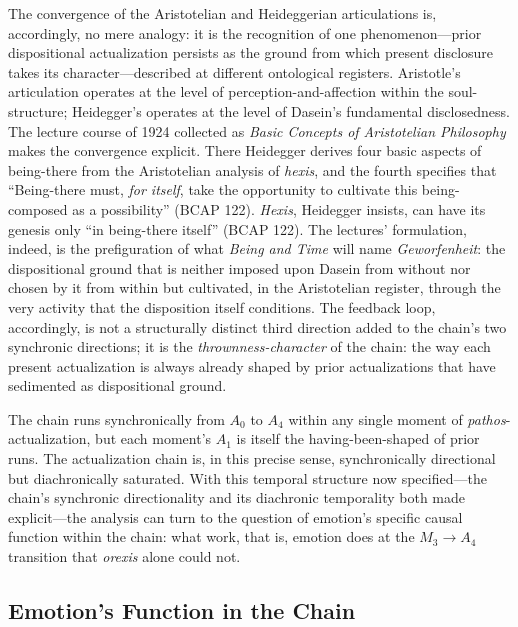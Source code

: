\documentclass{article}
\begin{document}
The convergence of the Aristotelian and Heideggerian articulations is, accordingly, no mere analogy: it is the recognition of one phenomenon---prior dispositional actualization persists as the ground from which present disclosure takes its character---described at different ontological registers. Aristotle's articulation operates at the level of perception-and-affection within the soul-structure; Heidegger's operates at the level of Dasein's fundamental disclosedness. The lecture course of 1924 collected as \textit{Basic Concepts of Aristotelian Philosophy} makes the convergence explicit. There Heidegger derives four basic aspects of being-there from the Aristotelian analysis of \textit{hexis}, and the fourth specifies that ``Being-there must, \textit{for itself}, take the opportunity to cultivate this being-composed as a possibility'' (BCAP 122). \textit{Hexis}, Heidegger insists, can have its genesis only ``in being-there itself'' (BCAP 122). The lectures' formulation, indeed, is the prefiguration of what \textit{Being and Time} will name \textit{Geworfenheit}: the dispositional ground that is neither imposed upon Dasein from without nor chosen by it from within but cultivated, in the Aristotelian register, through the very activity that the disposition itself conditions. The feedback loop, accordingly, is not a structurally distinct third direction added to the chain's two synchronic directions; it is the \textit{thrownness-character} of the chain: the way each present actualization is always already shaped by prior actualizations that have sedimented as dispositional ground.

The chain runs synchronically from $A_0$ to $A_4$ within any single moment of \textit{pathos}-actualization, but each moment's $A_1$ is itself the having-been-shaped of prior runs. The actualization chain is, in this precise sense, synchronically directional but diachronically saturated. With this temporal structure now specified---the chain's synchronic directionality and its diachronic temporality both made explicit---the analysis can turn to the question of emotion's specific causal function within the chain: what work, that is, emotion does at the $M_3 \rightarrow A_4$ transition that \textit{orexis} alone could not.

\subsection{Emotion's Function in the Chain}
\end{document}
